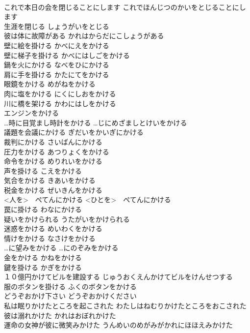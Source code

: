 \documentclass[8pt]{extreport}
\begin{document}
\begin{CJK}{UTF8}{min}
\\	これで本日の会を閉じることにします	これでほんじつのかいをとじることにします	
\\	生涯を閉じる	しょうがいをとじる	
\\	彼は体に故障がある	かれはからだにこしょうがある	
\\	壁に絵を掛ける	かべにえをかける	
\\	壁に梯子を掛ける	かべにはしごをかける	
\\	鍋を火にかける	なべをひにかける	
\\	肩に手を掛ける	かたにてをかける	
\\	眼鏡をかける	めがねをかける	
\\	肉に塩をかける	にくにしおをかける	
\\	川に橋を架ける	かわにはしをかける	
\\	エンジンをかける		
\\	…時に目覚まし時計をかける	…じにめざましとけいをかける	
\\	議題を会議にかける	ぎだいをかいぎにかける	
\\	裁判にかける	さいばんにかける	
\\	圧力をかける	あつりょくをかける	
\\	命令をかける	めりれいをかける	
\\	声を掛ける	こえをかける	
\\	気合をかける	きあいをかける	
\\	税金をかける	ぜいきんをかける	
\\	<人を>　ぺてんにかける	<ひとを>　ぺてんにかける	
\\	罠に掛ける	わなにかける	
\\	疑いをかけられる	うたがいをかけられる	
\\	迷惑をかける	めいわくをかける	
\\	情けをかける	なさけをかける	
\\	…に望みをかける	…にのぞみをかける	
\\	金をかける	かねをかける	
\\	鍵を掛ける	かぎをかける	
\\	１０億円かけてビルを建設する	じゅうおくえんかけてビルをけんせつする	
\\	服のボタンを掛ける	ふくのボタンをかける	
\\	どうぞおかけ下さい	どうぞおかけください	
\\	私は眠りかけたところを起こされた	わたしはねむりかけたところをおこされた	
\\	彼は溺れかけた	かれはおぼれかけた	
\\	運命の女神が彼に微笑みかけた	うんめいのめがみがかれにほほえみかけた	

\end{CJK}
\end{document}
